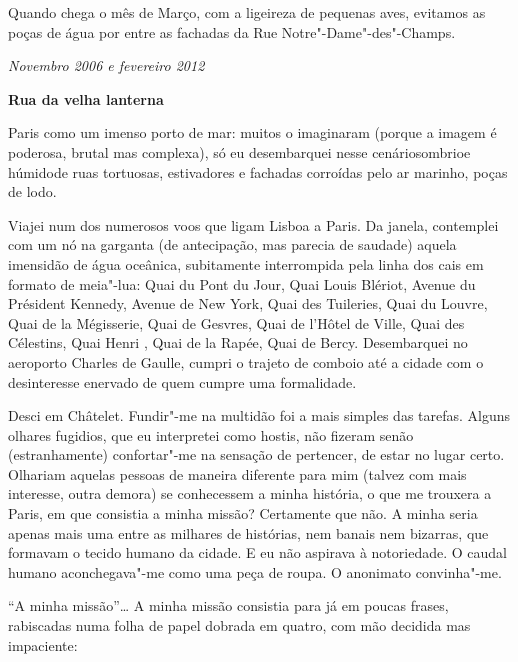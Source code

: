 Quando chega o mês de Março, com a ligeireza de pequenas aves,
evitamos as poças de água por entre as fachadas da Rue
Notre"-Dame"-des"-Champs.

\begin{flushright}
\emph{Novembro 2006 e fevereiro 2012}
\end{flushright}
\pagebreak
\thispagestyle{empty}

\movetooddpage\vspace*{1.8cm}
\noindent{}\textbf{Rua da velha lanterna}
\bigskip

Paris como um imenso porto de mar: muitos o imaginaram (porque a imagem é
poderosa, brutal mas complexa), só eu desembarquei nesse cenáriosombrioe
húmidode ruas tortuosas, estivadores e fachadas corroídas pelo ar
marinho, poças de lodo.

Viajei num dos numerosos voos que ligam Lisboa a Paris. Da janela,
contemplei com um nó na garganta (de antecipação, mas parecia de
saudade) aquela imensidão de água oceânica, subitamente interrompida
pela linha dos cais em formato de meia"-lua: Quai du Pont du Jour, Quai
Louis Blériot, Avenue du Président Kennedy, Avenue de New York, Quai des
Tuileries, Quai du Louvre, Quai de la Mégisserie, Quai de Gesvres, Quai
de l'Hôtel de Ville, Quai des Célestins, Quai Henri , Quai de la
Rapée, Quai de Bercy. Desembarquei no aeroporto Charles de Gaulle,
cumpri o trajeto de comboio até a cidade com o desinteresse enervado de
quem cumpre uma formalidade.

Desci em Châtelet. Fundir"-me na multidão foi a mais simples das tarefas.
Alguns olhares fugidios, que eu interpretei como hostis, não fizeram
senão (estranhamente) confortar"-me
na sensação de pertencer, de estar no lugar certo. Olhariam aquelas
pessoas de maneira diferente para mim (talvez com mais interesse, outra
demora) se conhecessem a minha história, o que me trouxera a Paris, em
que consistia a minha missão? Certamente que não. A minha seria apenas
mais uma entre as milhares de histórias, nem banais nem bizarras, que
formavam o tecido humano da cidade. E eu não aspirava à notoriedade. O
caudal humano aconchegava"-me como uma peça de roupa. O anonimato
convinha"-me.

``A minha missão''\ldots{} A minha missão consistia para já em poucas
frases, rabiscadas numa folha de papel dobrada em quatro, com mão
decidida mas impaciente:


